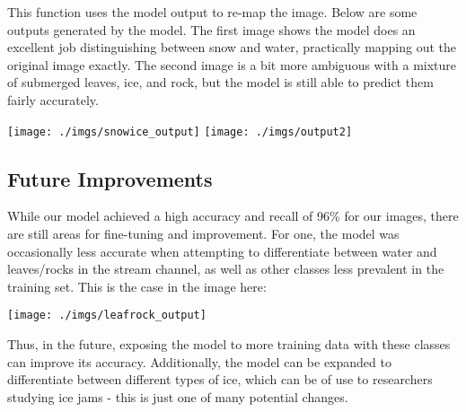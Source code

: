 \documentclass[
]{article}
\begin{document}
This function uses the model output to re-map the image. Below are some outputs generated by the model. The first image shows the model does an excellent job distinguishing between snow and water, practically mapping out the original image exactly. The second image is a bit more ambiguous with a mixture of submerged leaves, ice, and rock, but the model is still able to predict them fairly accurately.

\texttt{[image: ./imgs/snowice\_output]}
\texttt{[image: ./imgs/output2]}

\hypertarget{future-improvements}{%
\subsection{Future Improvements}\label{future-improvements}}

While our model achieved a high accuracy and recall of 96\% for our images, there are still areas for fine-tuning and improvement. For one, the model was occasionally less accurate when attempting to differentiate between water and leaves/rocks in the stream channel, as well as other classes less prevalent in the training set. This is the case in the image here:

\texttt{[image: ./imgs/leafrock\_output]}

Thus, in the future, exposing the model to more training data with these classes can improve its accuracy. Additionally, the model can be expanded to differentiate between different types of ice, which can be of use to researchers studying ice jams - this is just one of many potential changes.
\end{document}
